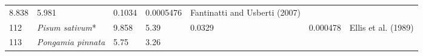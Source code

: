 \documentclass[]{article}
\begin{document}
\begin{longtable}[]{@{}lllllll@{}}
\begin{minipage}[t]{0.05\columnwidth}
8.838\strut
\end{minipage} & \begin{minipage}[t]{0.08\columnwidth}\raggedright
5.981\strut
\end{minipage} & \begin{minipage}[t]{0.08\columnwidth}\raggedright
0.1034\strut
\end{minipage} & \begin{minipage}[t]{0.08\columnwidth}\raggedright
0.0005476\strut
\end{minipage} & \begin{minipage}[t]{0.23\columnwidth}\raggedright
Fantinatti and Usberti (2007)\strut
\end{minipage}\tabularnewline
\begin{minipage}[t]{0.05\columnwidth}\raggedright
112\strut
\end{minipage} & \begin{minipage}[t]{0.23\columnwidth}\raggedright
\emph{Pisum sativum}*\strut
\end{minipage} & \begin{minipage}[t]{0.05\columnwidth}\raggedright
9.858\strut
\end{minipage} & \begin{minipage}[t]{0.08\columnwidth}\raggedright
5.39\strut
\end{minipage} & \begin{minipage}[t]{0.08\columnwidth}\raggedright
0.0329\strut
\end{minipage} & \begin{minipage}[t]{0.08\columnwidth}\raggedright
0.000478\strut
\end{minipage} & \begin{minipage}[t]{0.23\columnwidth}\raggedright
Ellis et al. (1989)\strut
\end{minipage}\tabularnewline
\begin{minipage}[t]{0.05\columnwidth}\raggedright
113\strut
\end{minipage} & \begin{minipage}[t]{0.23\columnwidth}\raggedright
\emph{Pongamia pinnata}\strut
\end{minipage} & \begin{minipage}[t]{0.05\columnwidth}\raggedright
5.75\strut
\end{minipage} & \begin{minipage}[t]{0.08\columnwidth}\raggedright
3.26\strut
\end{minipage} & \begin{minipage}[t]{0.08\columnwidth}\raggedright

\end{minipage}
\end{longtable}
\end{document}
